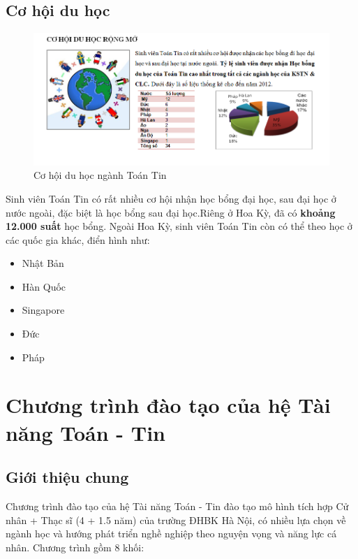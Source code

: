 \documentclass[12pt,a4paper]{report}
\begin{document}
    \section{Cơ hội du học}
    \begin{figure}[h]
        	\centering
        		\includegraphics[scale=0.75]{2.png}
        			\caption{Cơ hội du học ngành Toán Tin}
    \end{figure}
    
    Sinh viên Toán Tin có rất nhiều cơ hội nhận học bổng đại học, sau đại học ở nước ngoài, đặc biệt là học bổng sau đại học.Riêng ở Hoa Kỳ, đã có \textbf{khoảng 12.000 suất} học bổng. Ngoài Hoa Kỳ, sinh viên Toán Tin còn có thể theo học ở các quốc gia khác, điển hình như:
    
    \begin{itemize}
        \item Nhật Bản
        \item Hàn Quốc
        \item Singapore
        \item Đức
        \item Pháp
    \end{itemize}
    
    
    \chapter{Chương trình đào tạo của hệ Tài năng Toán - Tin}
    \section{Giới thiệu chung}
    
    Chương trình đào tạo của hệ Tài năng Toán - Tin đào tạo mô hình tích hợp Cử nhân + Thạc sĩ (4 + 1.5 năm) của trường ĐHBK Hà Nội, có nhiều lựa chọn về ngành học và hướng phát triển nghề nghiệp theo nguyện vọng và năng lực cá nhân. Chương trình gồm 8 khối:
    
\end{document}
